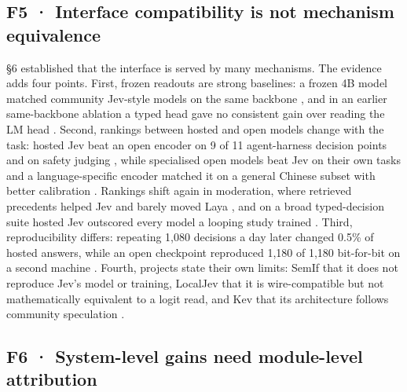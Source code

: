 \subsection{F5 · Interface compatibility is not mechanism equivalence}

§6 established that the interface is served by many mechanisms. The evidence adds four points. First, frozen readouts are strong baselines: a frozen 4B model matched community Jev-style models on the same backbone \citep{arxiv2610_02076}, and in an earlier same-backbone ablation a typed head gave no consistent gain over reading the LM head \citep{arxiv2609_25845}. Second, rankings between hosted and open models change with the task: hosted Jev beat an open encoder on 9 of 11 agent-harness decision points \citep{arxiv2610_02267} and on safety judging \citep{arxiv2609_33401}, while specialised open models beat Jev on their own tasks \citep{arxiv2610_05107,gh_lexmount_webjev} and a language-specific encoder matched it on a general Chinese subset with better calibration \citep{arxiv2609_36965}. Rankings shift again in moderation, where retrieved precedents helped Jev and barely moved Laya \citep{arxiv2610_07953}, and on a broad typed-decision suite hosted Jev outscored every model a looping study trained \citep{arxiv2610_07730}. Third, reproducibility differs: repeating 1,080 decisions a day later changed 0.5\% of hosted answers, while an open checkpoint reproduced 1,180 of 1,180 bit-for-bit on a second machine \citep{arxiv2610_02267}. Fourth, projects state their own limits: SemIf that it does not reproduce Jev's model or training, LocalJev that it is wire-compatible but not mathematically equivalent to a logit read, and Kev that its architecture follows community speculation \citep{gh_theoleecj_semif,gh_githubnext_localjev,gh_jaredpalmer_kev}.

\subsection{F6 · System-level gains need module-level attribution}

